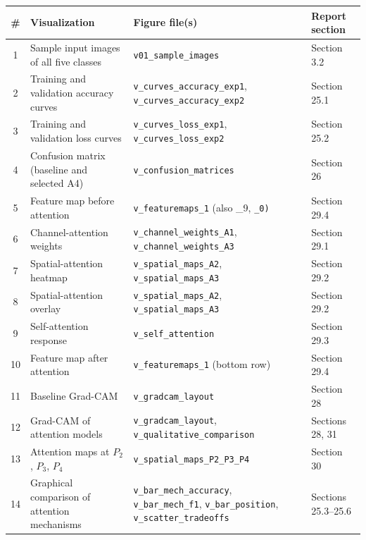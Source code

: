 \documentclass[10pt]{article}
\begin{document}
\begin{center}
\small
\begin{tabular}{|c|p{5.2cm}|p{6.2cm}|l|}
\hline
\textbf{\#} & \textbf{Visualization} & \textbf{Figure file(s)} & \textbf{Report section} \\
\hline
1 & Sample input images of all five classes & \texttt{v01\_sample\_images} & Section 3.2 \\
\hline
2 & Training and validation accuracy curves & \texttt{v\_curves\_accuracy\_exp1}, \texttt{v\_curves\_accuracy\_exp2} & Section 25.1 \\
\hline
3 & Training and validation loss curves & \texttt{v\_curves\_loss\_exp1}, \texttt{v\_curves\_loss\_exp2} & Section 25.2 \\
\hline
4 & Confusion matrix (baseline and selected A4) & \texttt{v\_confusion\_matrices} & Section 26 \\
\hline
5 & Feature map before attention & \texttt{v\_featuremaps\_1} (also \_9, \texttt{\_0)} & Section 29.4 \\
\hline
6 & Channel-attention weights & \texttt{v\_channel\_weights\_A1}, \texttt{v\_channel\_weights\_A3} & Section 29.1 \\
\hline
7 & Spatial-attention heatmap & \texttt{v\_spatial\_maps\_A2}, \texttt{v\_spatial\_maps\_A3} & Section 29.2 \\
\hline
8 & Spatial-attention overlay & \texttt{v\_spatial\_maps\_A2}, \texttt{v\_spatial\_maps\_A3} & Section 29.2 \\
\hline
9 & Self-attention response & \texttt{v\_self\_attention} & Section 29.3 \\
\hline
10 & Feature map after attention & \texttt{v\_featuremaps\_1} (bottom row) & Section 29.4 \\
\hline
11 & Baseline Grad-CAM & \texttt{v\_gradcam\_layout} & Section 28 \\
\hline
12 & Grad-CAM of attention models & \texttt{v\_gradcam\_layout}, \texttt{v\_qualitative\_comparison} & Sections 28, 31 \\
\hline
13 & Attention maps at $P_2$, $P_3$, $P_4$ & \texttt{v\_spatial\_maps\_P2\_P3\_P4} & Section 30 \\
\hline
14 & Graphical comparison of attention mechanisms & \texttt{v\_bar\_mech\_accuracy}, \texttt{v\_bar\_mech\_f1}, \texttt{v\_bar\_position}, \texttt{v\_scatter\_tradeoffs} & Sections 25.3--25.6 \\
\hline
\end{tabular}
\end{center}
\end{document}
